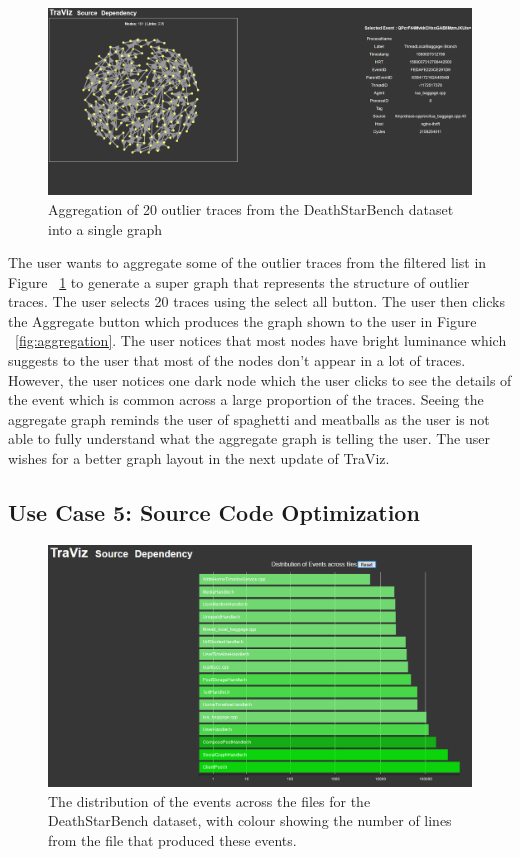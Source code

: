 \begin{figure}
    \centering
    \includegraphics[width=\textwidth]{fig/aggregate}
    \caption{Aggregation of 20 outlier traces from the DeathStarBench dataset into a single graph}
    \label{fig:outlier}
\end{figure}

The user wants to aggregate some of the outlier traces from the filtered list
in Figure ~\ref{fig:outlier}
to generate
a super graph that represents the structure of outlier traces. The user
selects 20 traces using the select all button. The user then clicks
the Aggregate button which produces the graph shown to the user
in Figure ~\ref{fig:aggregation}. The user notices that most nodes
have bright luminance which suggests to the user that most of the
nodes don't appear in a lot of traces. However, the user notices
one dark node which the user clicks to see the details of the event
which is common across a large proportion of the traces.
Seeing the aggregate graph reminds the user of spaghetti and meatballs
as the user is not able to fully understand what the aggregate graph
is telling the user. The user wishes for a better graph layout in the next
update of TraViz.

\subsection{Use Case 5: Source Code Optimization}

\begin{figure}
    \centering
    \includegraphics[width=\textwidth]{fig/sourcecode1}
    \caption{The distribution of the events across the files for the DeathStarBench dataset, with colour showing the number of lines from the
    file that produced these events.}
    \label{fig:source1}
\end{figure}

